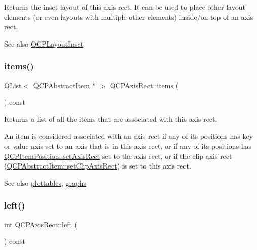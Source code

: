 Returns the inset layout of this axis rect. It can be used to place other layout elements (or even layouts with multiple other elements) inside/on top of an axis rect.

\begin{DoxySeeAlso}{See also}
\hyperlink{class_q_c_p_layout_inset}{Q\+C\+P\+Layout\+Inset} 
\end{DoxySeeAlso}
\mbox{\label{class_q_c_p_axis_rect_a03c113a2175448300ee8f944e24776ba}} 
\subsubsection{\texorpdfstring{items()}{items()}}
{\footnotesize\ttfamily \hyperlink{class_q_list}{Q\+List}$<$ \hyperlink{class_q_c_p_abstract_item}{Q\+C\+P\+Abstract\+Item} $\ast$ $>$ Q\+C\+P\+Axis\+Rect\+::items (\begin{DoxyParamCaption}{ }\end{DoxyParamCaption}) const}

Returns a list of all the items that are associated with this axis rect.

An item is considered associated with an axis rect if any of its positions has key or value axis set to an axis that is in this axis rect, or if any of its positions has \hyperlink{class_q_c_p_item_position_a0cd9b326fb324710169e92e8ca0041c2}{Q\+C\+P\+Item\+Position\+::set\+Axis\+Rect} set to the axis rect, or if the clip axis rect (\hyperlink{class_q_c_p_abstract_item_a7dc75fcbcd10206fe0b75d757ea7a347}{Q\+C\+P\+Abstract\+Item\+::set\+Clip\+Axis\+Rect}) is set to this axis rect.

\begin{DoxySeeAlso}{See also}
\hyperlink{class_q_c_p_axis_rect_a587d073a97b27bc7293fab4b2774ad59}{plottables}, \hyperlink{class_q_c_p_axis_rect_a2d9ded3eca97be1fcb5867949391bb88}{graphs} 
\end{DoxySeeAlso}
\mbox{\label{class_q_c_p_axis_rect_afb4a3de02046b20b9310bdb8fca781c3}} 
\subsubsection{\texorpdfstring{left()}{left()}}
{\footnotesize\ttfamily int Q\+C\+P\+Axis\+Rect\+::left (\begin{DoxyParamCaption}{ }\end{DoxyParamCaption}) const\hspace{0.3cm}{\ttfamily [inline]}}

